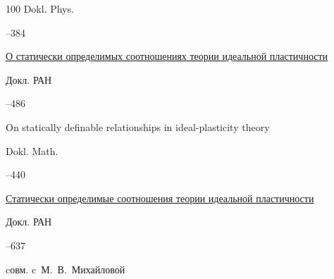 \begin{thebibliography}{100}
\jour Dokl. Phys.




--384






\paper \href{http://elibrary.ru/item.asp?id=17339436}{О статически определимых соотношениях теории идеальной пластичности}

\jour Докл. РАН




--486




\transl

\paper On statically definable relationships in ideal-plasticity theory



\jour Dokl. Math.




--440




\paper \href{http://elibrary.ru/item.asp?id=17345189}{Статически определимые соотношения теории идеальной пластичности}

\jour Докл. РАН




--637



\miscnote cовм. c~М.~В.~Михайловой

\transl


\end{thebibliography}
